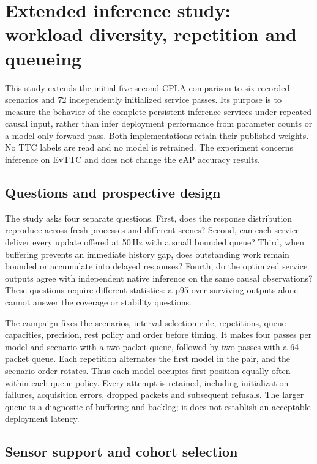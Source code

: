 \section{Extended inference study: workload diversity, repetition and queueing}
\label{sec:extended-inference}

This study extends the initial five-second CPLA comparison to six recorded scenarios and 72 independently initialized service passes. Its purpose is to measure the behavior of the complete persistent inference services under repeated causal input, rather than infer deployment performance from parameter counts or a model-only forward pass. Both implementations retain their published weights. No TTC labels are read and no model is retrained. The experiment concerns inference on EvTTC and does not change the eAP accuracy results.

\subsection{Questions and prospective design}

The study asks four separate questions. First, does the response distribution reproduce across fresh processes and different scenes? Second, can each service deliver every update offered at 50\,Hz with a small bounded queue? Third, when buffering prevents an immediate history gap, does outstanding work remain bounded or accumulate into delayed responses? Fourth, do the optimized service outputs agree with independent native inference on the same causal observations? These questions require different statistics: a p95 over surviving outputs alone cannot answer the coverage or stability questions.

The campaign fixes the scenarios, interval-selection rule, repetitions, queue capacities, precision, rest policy and order before timing. It makes four passes per model and scenario with a two-packet queue, followed by two passes with a 64-packet queue. Each repetition alternates the first model in the pair, and the scenario order rotates. Thus each model occupies first position equally often within each queue policy. Every attempt is retained, including initialization failures, acquisition errors, dropped packets and subsequent refusals. The larger queue is a diagnostic of buffering and backlog; it does not establish an acceptable deployment latency.

\subsection{Sensor support and cohort selection}

